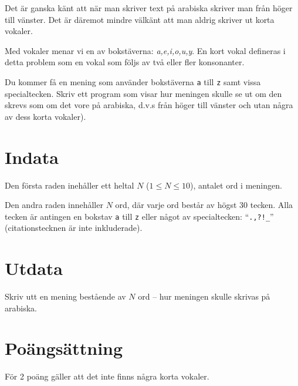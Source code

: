 Det är ganska känt att när man skriver text på arabiska skriver man från höger till vänster.
Det är däremot mindre välkänt att man aldrig skriver ut korta vokaler.

Med vokaler menar vi en av bokstäverna: \textit{a,e,i,o,u,y}.
En kort vokal defineras i detta problem som en vokal som följs av två eller fler konsonanter.

Du kommer få en mening som använder bokstäverna \texttt{a} till \texttt{z} samt vissa specialtecken.
Skriv ett program som visar hur meningen skulle se ut om den skrevs som om det vore på arabiska, d.v.s från höger till vänster och utan några av dess korta vokaler).

\section*{Indata}
Den första raden inehåller ett heltal $N$ ($1 \le N \le 10$), antalet ord i meningen.

Den andra raden innehåller $N$ ord, där varje ord består av högst 30 tecken. Alla tecken är antingen en bokstav \texttt{a} till \texttt{z} eller något av specialtecken: ``\texttt{.,?!\_}'' (citationstecknen är inte inkluderade).

\section*{Utdata}
Skriv utt en mening bestående av $N$ ord -- hur meningen skulle skrivas på arabiska.

\section*{Poängsättning}
För 2 poäng gäller att det inte finns några korta vokaler. \\
